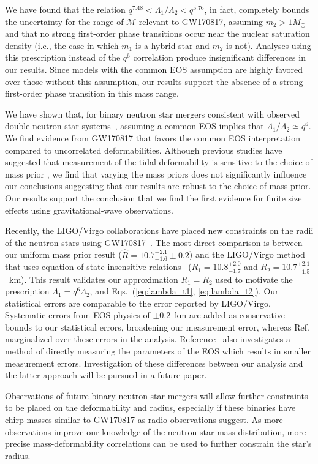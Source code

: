 We have found that the relation $q^{7.48} < \Lambda_1/\Lambda_2 < q^{5.76}$, in fact, completely bounds the uncertainty for the range of $\mathcal{M}$ relevant to GW170817, assuming $m_2 > 1M_\odot$ \cite{Zhao:2018nyf} and that no strong first-order phase transitions occur near the nuclear saturation density (i.e., the case in which $m_1$ is a hybrid star and $m_2$ is not). Analyses using this prescription instead of the $q^6$ correlation produce insignificant differences in our results. Since models with the common EOS assumption are highly favored over those without this assumption, our results support the absence of a strong first-order phase transition in this mass range.

We have shown that, for binary neutron star mergers consistent with observed double neutron star systems~\cite{Tauris:2017omb}, assuming a common EOS implies that $\Lambda_1 / \Lambda_2 \simeq q^6$. We find evidence from GW170817 that favors the common EOS interpretation compared to uncorrelated deformabilities. Although previous studies have suggested that measurement of the tidal deformability is sensitive to the choice of mass prior \cite{Agathos:2015uaa}, we find that varying the mass priors does not significantly influence our conclusions suggesting that our results are robust to the choice of mass prior. Our results support the conclusion that we find the first evidence for finite size effects using gravitational-wave observations. 

Recently, the LIGO/Virgo collaborations have placed new constraints on the radii of the neutron stars using GW170817~\cite{Abbott:2018exr}. The most direct comparison is between our uniform mass prior result ($\hat R = 10.7^{+2.1}_{-1.6} \pm 0.2$) and the LIGO/Virgo method that uses equation-of-state-insensitive relations~\cite{Yagi:2016qmr,Chatziioannou:2018vzf} ($R_1 = 10.8^{+2.0}_{-1.7}$ and $R_2 = 10.7^{+2.1}_{-1.5}$~km). This result validates our approximation $R_1=R_2$ used to motivate the prescription $\Lambda_1=q^6\Lambda_2$, and Eqs.~(\ref{eq:lambda_t1}, \ref{eq:lambda_t2}). Our statistical errors are comparable to the error reported by LIGO/Virgo. Systematic errors from EOS physics of $\pm 0.2$~km are added as conservative bounds to our statistical errors, broadening our measurement error, whereas Ref.~\cite{Abbott:2018exr} marginalized over these errors in the analysis. Reference~\cite{Abbott:2018exr} also investigates a method of directly measuring the parameters of the EOS which results in smaller measurement errors. Investigation of these differences between our analysis and the latter approach will be pursued in a future paper. 

Observations of future binary neutron star mergers will allow further constraints to be placed on the deformability and radius, especially if these binaries have chirp masses similar to GW170817 as radio observations suggest. As more observations improve our knowledge of the neutron star mass distribution, more precise mass-deformability correlations can be used to further constrain the star's radius.


